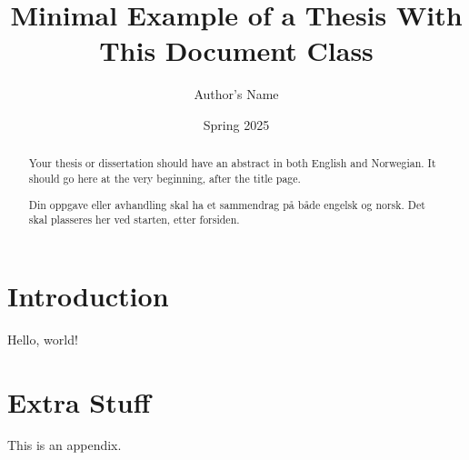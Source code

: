 \documentclass[master]{thesis}
\title{Minimal Example of a Thesis With This Document Class}
\author{Author's Name}
\date{Spring 2025}
\begin{document}
\maketitle

\frontmatter

\begin{abstract}

Your thesis or dissertation should have an abstract in both English and Norwegian. It should go here at the very beginning, after the title page.

\end{abstract}

\begin{otherlanguage}{norsk}
\begin{abstract}

Din oppgave eller avhandling skal ha et sammendrag på både engelsk og norsk. Det skal plasseres her ved starten, etter forsiden.

\end{abstract}
\end{otherlanguage}

\tableofcontents

\mainmatter

\chapter{Introduction}

Hello, world!

\appendix

\chapter{Extra Stuff}

This is an appendix.
\end{document}
